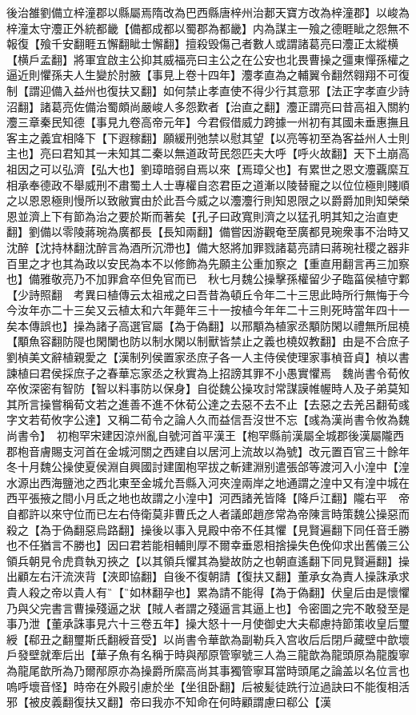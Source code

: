 後治雒劉備立梓潼郡以縣屬焉隋改為巴西縣唐梓州治郪天寶方改為梓潼郡】以峻為梓潼太守灋正外統都畿【備都成都以蜀郡為都畿】内為謀主一飱之德睚眦之怨無不報復【飱千安翻睚五懈翻眦士懈翻】擅殺毁傷己者數人或謂諸葛亮曰灋正太縱横【横戶孟翻】將軍宜啟主公抑其威福亮曰主公之在公安也北畏曹操之彊東憚孫權之逼近則懼孫夫人生變於肘腋【事見上卷十四年】灋孝直為之輔翼令翻然翱翔不可復制【謂迎備入益州也復扶又翻】如何禁止孝直使不得少行其意邪【法正字孝直少詩沼翻】諸葛亮佐備治蜀頗尚嚴峻人多怨歎者【治直之翻】灋正謂亮曰昔高祖入關約灋三章秦民知德【事見九卷高帝元年】今君假借威力跨據一州初有其國未垂惠撫且客主之義宜相降下【下遐稼翻】願緩刑弛禁以慰其望【以亮等初至為客益州人士則主也】亮曰君知其一未知其二秦以無道政苛民怨匹夫大呼【呼火故翻】天下土崩高祖因之可以弘濟【弘大也】劉璋暗弱自焉以來【焉璋父也】有累世之恩文灋覊縻互相承奉德政不舉威刑不肅蜀土人士專權自恣君臣之道漸以陵替寵之以位位極則賤順之以恩恩極則慢所以致敝實由於此吾今威之以灋灋行則知恩限之以爵爵加則知榮榮恩並濟上下有節為治之要於斯而著矣【孔子曰政寬則濟之以猛孔明其知之治直吏翻】劉備以零陵蔣琬為廣都長【長知兩翻】備嘗因游觀奄至廣都見琬衆事不治時又沈醉【沈持林翻沈醉言為酒所沉滯也】備大怒將加罪戮諸葛亮請曰蔣琬社稷之器非百里之才也其為政以安民為本不以修飾為先願主公重加察之【重直用翻言再三加察也】備雅敬亮乃不加罪倉卒但免官而已　秋七月魏公操擊孫權留少子臨菑侯植守鄴【少詩照翻　考異曰植傳云太祖戒之曰吾昔為頓丘令年二十三思此時所行無悔于今今汝年亦二十三矣又云植太和六年薨年三十一按植今年年二十三則死時當年四十一矣本傳誤也】操為諸子高選官屬【為于偽翻】以邢顒為植家丞顒防閑以禮無所屈橈【顒魚容翻防隄也閑闌也防以制水閑以制獸皆禁止之義也橈奴教翻】由是不合庶子劉楨美文辭植親愛之【漢制列侯置家丞庶子各一人主侍侯使理家事楨音貞】楨以書諫植曰君侯採庶子之春華忘家丞之秋實為上招謗其罪不小愚實懼焉　魏尚書令荀攸卒攸深密有智防【智以料事防以保身】自從魏公操攻討常謀謨帷幄時人及子弟莫知其所言操嘗稱荀文若之進善不進不休荀公達之去惡不去不止【去惡之去羌呂翻荀彧字文若荀攸字公達】又稱二荀令之論人久而益信吾沒世不忘【彧為漢尚書令攸為魏尚書令】　初枹罕宋建因涼州亂自號河首平漢王【枹罕縣前漢屬全城郡後漢屬隴西郡枹音膚賜支河首在金城河關之西建自以居河上流故以為號】改元置百官三十餘年冬十月魏公操使夏侯淵自興國討建圍枹罕拔之斬建淵别遣張郃等渡河入小湟中【湟水源出西海鹽池之西北東至金城允吾縣入河夾湟兩岸之地通謂之湟中又有湟中城在西平張掖之間小月氐之地也故謂之小湟中】河西諸羌皆降【降戶江翻】隴右平　帝自都許以來守位而已左右侍衛莫非曹氏之人者議郎趙彦常為帝陳言時策魏公操惡而殺之【為于偽翻惡烏路翻】操後以事入見殿中帝不任其懼【見賢遍翻下同任音壬勝也不任猶言不勝也】因曰君若能相輔則厚不爾幸垂恩相捨操失色俛仰求出舊儀三公領兵朝見令虎賁執刃挾之【以其領兵懼其為變故防之也朝直遙翻下同見賢遍翻】操出顧左右汗流浹背【浹即協翻】自後不復朝請【復扶又翻】董承女為責人操誅承求貴人殺之帝以貴人有【如林翻孕也】累為請不能得【為于偽翻】伏皇后由是懷懼乃與父完書言曹操殘逼之狀【賊人者謂之殘逼言其逼上也】令密圖之完不敢發至是事乃泄【董承誅事見六十三卷五年】操大怒十一月使御史大夫郗慮持節策收皇后璽綬【郗丑之翻璽斯氏翻綬音受】以尚書令華歆為副勒兵入宫收后后閉戶藏壁中歆壞戶發壁就牽后出【華子魚有名稱于時與邴原管寧號三人為三龍歆為龍頭原為龍腹寧為龍尾歆所為乃爾邴原亦為操爵所縻高尚其事獨管寧耳當時頭尾之論盖以名位言也嗚呼壞音怪】時帝在外殿引慮於坐【坐徂卧翻】后被髪徒跣行泣過訣曰不能復相活邪【被皮義翻復扶又翻】帝曰我亦不知命在何時顧謂慮曰郗公【漢